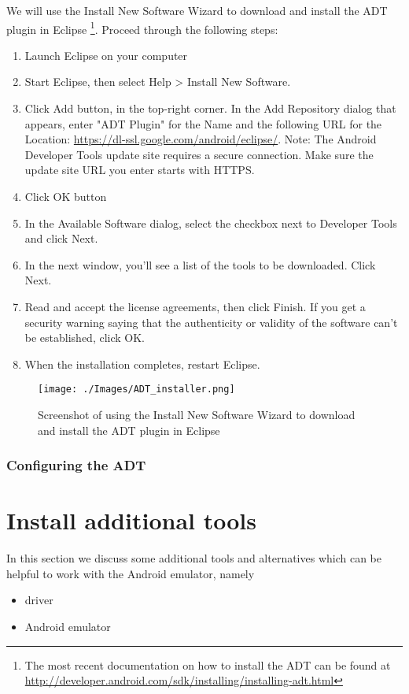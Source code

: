 We will use the Install New Software Wizard to download and install the ADT
plugin in Eclipse%
\footnote{The most recent documentation on how to install the ADT can be found
   at \url{http://developer.android.com/sdk/installing/installing-adt.html}}.
Proceed through the following steps:
\begin{enumerate}
   \item Launch Eclipse on your computer
   \item Start Eclipse, then select Help > Install New Software.
    \item Click Add button, in the top-right corner.  In the Add Repository dialog that
      appears, enter "ADT Plugin" for the Name and the following URL for the
      Location: \url{https://dl-ssl.google.com/android/eclipse/}.
      Note: The Android
      Developer Tools update site requires a secure connection. Make sure the
      update site URL you enter starts with HTTPS.
   \item Click OK button
   \item In the Available Software dialog, select the checkbox next to
      Developer Tools and click Next.
   \item In the next window, you'll see a list of the tools to be downloaded.
      Click Next.
   \item Read and accept the license agreements, then click Finish.
      If you get a security warning saying that the authenticity or validity of
      the software can't be established, click OK.
   \item When the installation completes, restart Eclipse.
\end{enumerate}

\begin{figure}
   \centering
   \texttt{[image: ./Images/ADT\_installer.png]}
   \caption{Screenshot of using the Install New Software Wizard to download and
      install the ADT plugin in Eclipse}
\end{figure}

\subsubsection{Configuring the ADT}

\section{Install additional tools}

In this section we discuss some additional tools and alternatives which can be helpful to work
with the Android emulator, namely
\begin{itemize}
   \item \intelHAXM{} driver
   \item \genymotion{} Android emulator
\end{itemize}

